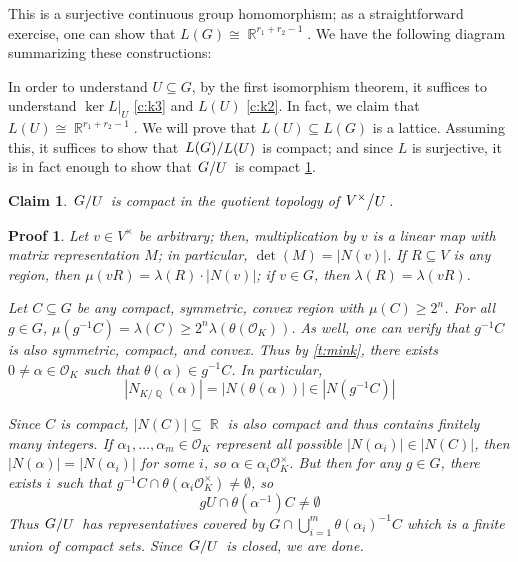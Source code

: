 \documentclass[11pt, a4paper]{memoir}
\DeclareMathOperator{\Q}{{\mathbb{Q}}}
\DeclareMathOperator{\R}{{\mathbb{R}}}
\newcommand{\abs}[1]{\ensuremath{\left\lvert#1\right\rvert}}
\theoremstyle{change}
\theoremstyle{plain}
\newtheorem{claim}{Claim}
\theoremstyle{nonumberplain}
\newtheorem{nmproof}{Proof}
\newcommand{\quot}[2]{\mathchoice{\left.\raisebox{0.07em}{$#1$}\middle/\raisebox{-0.07em}{$#2$}\right.}
                                 {\left.\raisebox{0.03em}{$#1$}\middle/\raisebox{-0.03em}{$#2$}\right.}
                                 {\left.\raisebox{0.00em}{$#1$}\middle/\raisebox{-0.00em}{$#2$}\right.}
                                 {\left.\raisebox{0em}{$#1$}\middle/\raisebox{0em}{$#2$}\right.}}
\numberwithin{equation}{section}
\begin{document}
This is a surjective continuous group homomorphism; as a straightforward exercise, one can show that $L(G)\cong\R^{r_1+r_2-1}$.
We have the following diagram summarizing these constructions:
\begin{center}
\end{center}
In order to understand $U\subseteq G$, by the first isomorphism theorem, it suffices to understand $\ker L|_U$ \cref{c:k3} and $L(U)$ \cref{c:k2}.
In fact, we claim that $L(U)\cong \R^{r_1+r_2-1}$.
We will prove that $L(U)\subseteq L(G)$ is a lattice.
Assuming this, it suffices to show that $\quot{L(G)}{L(U)}$ is compact; and since $L$ is surjective, it is in fact enough to show that $\quot{G}{U}$ is compact \cref{c:k1}.
\begin{claim}\label{c:k1}
    $\quot{G}{U}$ is compact in the quotient topology of $\quot{V^\times}{U}$.
\end{claim}
\begin{nmproof}
    Let $v\in V^\times$ be arbitrary; then, multiplication by $v$ is a linear map with matrix representation $M$; in particular, $\det(M)=|N(v)|$.
    If $R\subseteq V$ is any region, then $\mu(vR)=\lambda(R)\cdot|N(v)|$; if $v\in G$, then $\lambda(R)=\lambda(vR)$.

    Let $C\subseteq G$ be any compact, symmetric, convex region with $\mu(C)\geq 2^n$.
    For all $g\in G$, $\mu(g^{-1}C)=\lambda(C)\geq 2^n\lambda(\theta(\mathcal{O}_K))$.
    As well, one can verify that $g^{-1}C$ is also symmetric, compact, and convex.
    Thus by \cref{t:mink}, there exists $0\neq\alpha\in\mathcal{O}_K$ such that $\theta(\alpha)\in g^{-1}C$.
    In particular,
    \begin{equation*}
        \abs{N_{K/\Q}(\alpha)}=\abs{N(\theta(\alpha))}\in\abs{N(g^{-1}C)}
    \end{equation*}

    Since $C$ is compact, $|N(C)|\subseteq\R$ is also compact and thus contains finitely many integers.
    If $\alpha_1,\ldots,\alpha_m\in\mathcal{O}_K$ represent all possible $|N(\alpha_i)|\in|N(C)|$, then $|N(\alpha)|=|N(\alpha_i)|$ for some $i$, so $\alpha\in\alpha_i\mathcal{O}_K^\times$.
    But then for any $g\in G$, there exists $i$ such that $g^{-1}C\cap\theta(\alpha_i\mathcal{O}_K^\times)\neq\emptyset$, so
    \begin{equation*}
        gU\cap\theta(\alpha^{-1})C\neq\emptyset
    \end{equation*}
    Thus $\quot{G}{U}$ has representatives covered by $G\cap\bigcup_{i=1}^m\theta(\alpha_i)^{-1}C$ which is a finite union of compact sets.
    Since $\quot{G}{U}$ is closed, we are done.
\end{nmproof}
\end{document}
